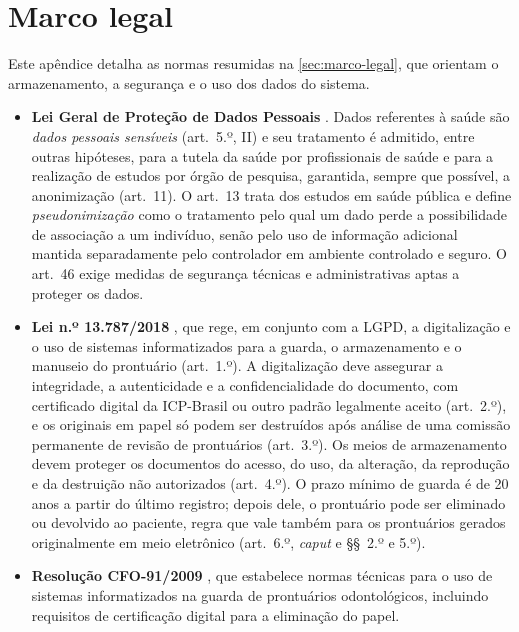 \chapter{Marco legal}
\label{apendice:marco-legal}

Este apêndice detalha as normas resumidas na \autoref{sec:marco-legal}, que orientam o armazenamento, a segurança e o uso dos dados do sistema.

\begin{itemize}
	\item \textbf{Lei Geral de Proteção de Dados Pessoais} \cite{lgpd2018}. Dados referentes à saúde são \emph{dados pessoais sensíveis} (art.~5.º, II) e seu tratamento é admitido, entre outras hipóteses, para a tutela da saúde por profissionais de saúde e para a realização de estudos por órgão de pesquisa, garantida, sempre que possível, a anonimização (art.~11). O art.~13 trata dos estudos em saúde pública e define \emph{pseudonimização} como o tratamento pelo qual um dado perde a possibilidade de associação a um indivíduo, senão pelo uso de informação adicional mantida separadamente pelo controlador em ambiente controlado e seguro. O art.~46 exige medidas de segurança técnicas e administrativas aptas a proteger os dados.
	\item \textbf{Lei n.º 13.787/2018} \cite{lei13787}, que rege, em conjunto com a LGPD, a digitalização e o uso de sistemas informatizados para a guarda, o armazenamento e o manuseio do prontuário (art.~1.º). A digitalização deve assegurar a integridade, a autenticidade e a confidencialidade do documento, com certificado digital da ICP-Brasil ou outro padrão legalmente aceito (art.~2.º), e os originais em papel só podem ser destruídos após análise de uma comissão permanente de revisão de prontuários (art.~3.º). Os meios de armazenamento devem proteger os documentos do acesso, do uso, da alteração, da reprodução e da destruição não autorizados (art.~4.º). O prazo mínimo de guarda é de 20 anos a partir do último registro; depois dele, o prontuário pode ser eliminado ou devolvido ao paciente, regra que vale também para os prontuários gerados originalmente em meio eletrônico (art.~6.º, \textit{caput} e §§~2.º e 5.º).
	\item \textbf{Resolução CFO-91/2009} \cite{cfo91-2009}, que estabelece normas técnicas para o uso de sistemas informatizados na guarda de prontuários odontológicos, incluindo requisitos de certificação digital para a eliminação do papel.
\end{itemize}

